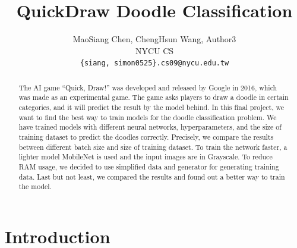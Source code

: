 \documentclass[10pt,twocolumn,letterpaper]{article}
\begin{document}
\title{QuickDraw Doodle Classification}

\author{
MaoSiang Chen, ChengHsun Wang, Author3\\
NYCU CS\\
{\tt\small \{siang, simon0525\}.cs09@nycu.edu.tw}
%
}


\maketitle

\begin{abstract}
The AI game ``Quick, Draw!'' was developed and released by Google in 2016, 
which was made as an experimental game. 
The game asks players to draw a doodle in certain categories,
and it will predict the result by the model behind. 
In this final project, 
we want to find the best way to train models for the doodle classification problem. 
We have trained models with different neural networks, hyperparameters, 
and the size of training dataset to predict the doodles correctly. 
Precisely, we compare the results between different batch size and size of training dataset.
To train the network faster, 
a lighter model MobileNet is used and the input images are in Grayscale.
To reduce RAM usage, we decided to use simplified data and generator for generating training data.
Last but not least, we compared the results and found out a better way to train the model.

\end{abstract}




\section{Introduction}
\end{document}
